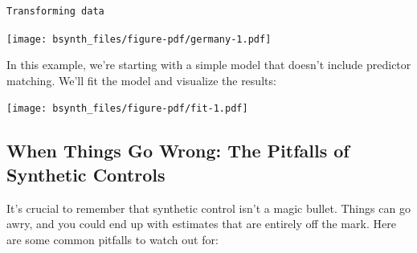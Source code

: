 \documentclass[
  letterpaper,
  DIV=11,
  numbers=noendperiod]{scrreprt}
\newenvironment{Shaded}{\begin{snugshade}}{\end{snugshade}}
\newcommand{\AttributeTok}[1]{\textcolor[rgb]{0.40,0.45,0.13}{#1}}
\newcommand{\CommentTok}[1]{\textcolor[rgb]{0.37,0.37,0.37}{#1}}
\newcommand{\DecValTok}[1]{\textcolor[rgb]{0.68,0.00,0.00}{#1}}
\newcommand{\FunctionTok}[1]{\textcolor[rgb]{0.28,0.35,0.67}{#1}}
\newcommand{\NormalTok}[1]{\textcolor[rgb]{0.00,0.23,0.31}{#1}}
\newcommand{\SpecialCharTok}[1]{\textcolor[rgb]{0.37,0.37,0.37}{#1}}
\newcommand{\StringTok}[1]{\textcolor[rgb]{0.13,0.47,0.30}{#1}}
\begin{document}
\begin{verbatim}
Transforming data
\end{verbatim}

\begin{Shaded}
\end{Shaded}

\texttt{[image: bsynth\_files/figure-pdf/germany-1.pdf]}

In this example, we're starting with a simple model that doesn't include
predictor matching. We'll fit the model and visualize the results:

\begin{Shaded}
\end{Shaded}

\texttt{[image: bsynth\_files/figure-pdf/fit-1.pdf]}

\subsection{When Things Go Wrong: The Pitfalls of Synthetic
Controls}\label{when-things-go-wrong-the-pitfalls-of-synthetic-controls}

It's crucial to remember that synthetic control isn't a magic bullet.
Things can go awry, and you could end up with estimates that are
entirely off the mark. Here are some common pitfalls to watch out for:
\end{document}
